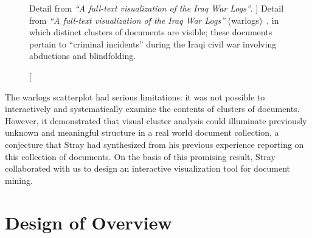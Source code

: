 \begin{figure}
	\centering
	\caption
	[
	    Detail from \textsl{``A full-text visualization of the Iraq War Logs''}.
	]
	{
	    Detail from \textsl{``A full-text visualization of the Iraq War Logs''} ({\sc warlogs})~\cite{Stray2010}, in which distinct clusters of documents are visible; these documents pertain to ``criminal incidents'' during the Iraqi civil war involving abductions and blindfolding.
	}
	\centering
	\label{overview:fig:warlogs}
\end{figure}


The {\sc warlogs} scatterplot had serious limitations: it was not possible to interactively and systematically examine the contents of clusters of documents.
However, it demonstrated that visual cluster analysis could illuminate previously unknown and meaningful structure in a real world document collection, a conjecture that Stray had synthesized from his previous experience reporting on this collection of documents.
On the basis of this promising result, Stray collaborated with us to design an interactive visualization tool for document mining.


\section{Design of Overview}
\label{overview:overview}


